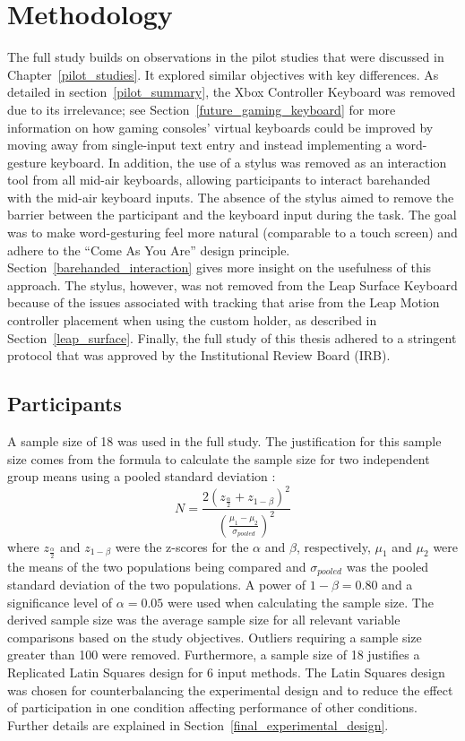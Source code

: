 \chapter{Methodology} \label{methodology}
\hspace{\parindent} The full study builds on observations in the pilot studies that were discussed in Chapter~\ref{pilot_studies}. It explored similar objectives with key differences. As detailed in section~\ref{pilot_summary}, the Xbox Controller Keyboard was removed due to its irrelevance; see Section~\ref{future_gaming_keyboard} for more information on how gaming consoles' virtual keyboards could be improved by moving away from single-input text entry and instead implementing a word-gesture keyboard. In addition, the use of a stylus was removed as an interaction tool from all mid-air keyboards, allowing participants to interact barehanded with the mid-air keyboard inputs. The absence of the stylus aimed to remove the barrier between the participant and the keyboard input during the task. The goal was to make word-gesturing feel more natural (comparable to a touch screen) and adhere to the ``Come As You Are'' design principle. Section~\ref{barehanded_interaction} gives more insight on the usefulness of this approach. The stylus, however, was not removed from the Leap Surface Keyboard because of the issues associated with tracking that arise from the Leap Motion controller placement when using the custom holder, as described in Section~\ref{leap_surface}. Finally, the full study of this thesis adhered to a stringent protocol that was approved by the Institutional Review Board (IRB).

\section{Participants} \label{final_participants}
A sample size of 18 was used in the full study. The justification for this sample size comes from the formula to calculate the sample size for two independent group means using a pooled standard deviation \cite{ref_sample_size}:
\begin{equation}
N = \frac{2(z_{\frac{\alpha}{2}} + z_{1-\beta})^2}{(\frac{\mu_1 - \mu_2}{\sigma_{pooled}})^2}
\end{equation}
where $z_{\frac{\alpha}{2}}$ and $z_{1-\beta}$ were the z-scores for the $\alpha$ and $\beta$, respectively, $\mu_1$ and $\mu_2$ were the means of the two populations being compared and $\sigma_{pooled}$ was the pooled standard deviation of the two populations. A power of $1-\beta = 0.80$ and a significance level of $\alpha = 0.05$ were used when calculating the sample size. The derived sample size was the average sample size for all relevant variable comparisons based on the study objectives. Outliers requiring a sample size greater than 100 were removed. Furthermore, a sample size of 18 justifies a Replicated Latin Squares design for 6 input methods. The Latin Squares design was chosen for counterbalancing the experimental design and to reduce the effect of participation in one condition affecting performance of other conditions. Further details are explained in Section~\ref{final_experimental_design}.

